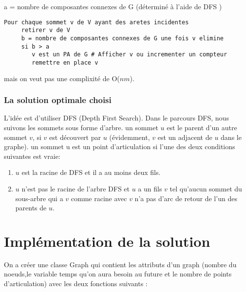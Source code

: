 \documentclass[12pt]{report}
\begin{document}
a = nombre de composantes connexes de G (déterminé à l'aide de DFS )\\
\lstset{language=Python}
\lstset{frame=lines}
\lstset{basicstyle=\footnotesize}
\begin{lstlisting}
Pour chaque sommet v de V ayant des aretes incidentes
	 retirer v de V
	 b = nombre de composantes connexes de G une fois v elimine
	 si b > a
        v est un PA de G # Afficher v ou incrementer un compteur  
        remettre en place v

\end{lstlisting}
mais on veut pas une complixité de O($nm$).
	\subsection{La solution optimale choisi}
L'idée est d'utiliser DFS (Depth First Search). Dans le parcours DFS, nous suivons les sommets sous forme d'arbre. un sommet $u$ est le parent d'un autre sommet $v$, si $v$ est découvert par $u$ (évidemment, $v$ est un adjacent de $u$ dans le graphe). un sommet u est un point d'articulation si l'une des deux conditions suivantes est vraie:
\begin{enumerate}
		\item $u$ est la racine de DFS et il a au moins deux fils.
		\item $u$ n'est pas le racine de l'arbre DFS et $u$ a un fils $v$ tel qu'aucun sommet du sous-arbre qui a $v$ comme racine avec $v$ n'a pas d'arc de retour de l'un des parents de $u$.
\end{enumerate}		

	\chapter{Implémentation de la solution}
	\par{}
On a créer une classe Graph qui contient les attributs d'un graph (nombre du noeuds,le variable temps qu'on aura besoin au future et le nombre de points d'articulation) avec les deux fonctions  suivants :
\end{document}
